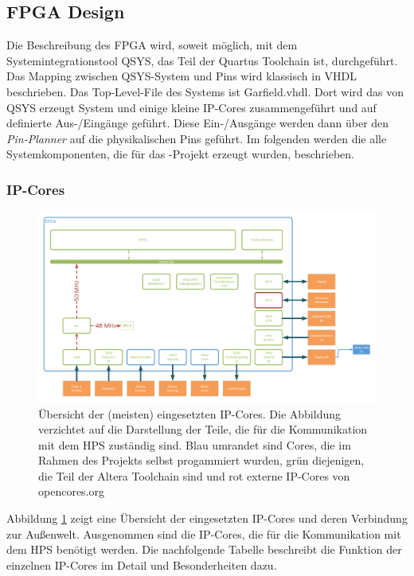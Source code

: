 \subsection{\ac{FPGA} Design}
Die Beschreibung des \ac{FPGA} wird, soweit möglich, mit dem Systemintegrationstool QSYS, das Teil der Quartus Toolchain ist, durchgeführt. Das Mapping zwischen QSYS-System und Pins wird klassisch in VHDL beschrieben. Das Top-Level-File des Systems ist Garfield.vhdl.  Dort wird das von QSYS erzeugt System und einige kleine \ac{IP}-Cores zusammengeführt und auf definierte Aus-/Eingänge geführt. Diese Ein-/Ausgänge werden dann über den \textit{Pin-Planner} auf die physikalischen Pins geführt. Im folgenden werden die alle Systemkomponenten, die für das \Projectname-Projekt erzeugt wurden, beschrieben.

\subsubsection{\ac{IP}-Cores}
\label{IP-Cores}

\begin{figure}
	\includegraphics[angle=90, height=0.9\textheight]{Abb/Garfield_FPGA_Design_only_FPGA.pdf}
	\caption{Übersicht der (meisten) eingesetzten \ac{IP}-Cores. Die Abbildung verzichtet auf die Darstellung der Teile, die für die Kommunikation mit dem \ac{HPS} zuständig sind. Blau umrandet sind Cores, die im Rahmen des Projekts selbst progammiert wurden, grün diejenigen, die Teil der Altera Toolchain sind und rot externe IP-Cores von opencores.org}
	\label{FPGA_IP_FPGA_only}
\end{figure}

Abbildung \ref{FPGA_IP_FPGA_only} zeigt eine Übersicht der eingesetzten \ac{IP}-Cores und deren Verbindung zur Außenwelt. Ausgenommen sind die \ac{IP}-Cores, die für die Kommunikation mit dem \ac{HPS} benötigt werden. Die nachfolgende Tabelle beschreibt die Funktion der einzelnen IP-Cores im Detail und Besonderheiten dazu.

